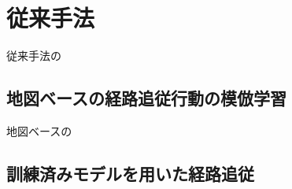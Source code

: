 \documentclass{jarticle}
\begin{document}
\section{従来手法\protect\\}
従来手法の\\

\subsection{地図ベースの経路追従行動の模倣学習}
地図ベースの\\

\subsection{訓練済みモデルを用いた経路追従}
\end{document}
